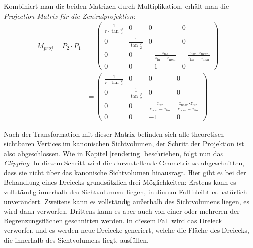 Kombiniert man die beiden Matrizen durch Multiplikation, erhält man die \emph{Projection Matrix für die Zentralprojektion}:
\begin{equation}
\begin{split}
 M_{proj} = P_2 \cdot P_1 &= 
 \begin{pmatrix}
  \frac{1}{r \cdot \tan\frac{\varphi}{2}} & 0 & 0 & 0 \\
  0 & \frac{1}{\tan\frac{\varphi}{2}} & 0 & 0 \\
  0 & 0 & -\frac{z_\mathrm{far}}{z_\mathrm{far}-z_\mathrm{near}} & -\frac{z_\mathrm{far} \cdot z_\mathrm{near}}{z_\mathrm{far}-z_\mathrm{near}} \\
  0 & 0 & -1 & 0
 \end{pmatrix} \\
 &= 
 \begin{pmatrix}
  \frac{1}{r \cdot \tan\frac{\varphi}{2}} & 0 & 0 & 0 \\
  0 & \frac{1}{\tan\frac{\varphi}{2}} & 0 & 0 \\
  0 & 0 & \frac{z_\mathrm{far}}{z_\mathrm{near}-z_\mathrm{far}} & \frac{z_\mathrm{near} \cdot z_\mathrm{far}}{z_\mathrm{near}-z_\mathrm{far}} \\
  0 & 0 & -1 & 0
 \end{pmatrix}
\end{split}
\end{equation}


Nach der Transformation mit dieser Matrix befinden sich alle theoretisch sichtbaren Vertices im kanonischen Sichtvolumen, der Schritt der Projektion ist also abgeschlossen. Wie in Kapitel \ref{rendering} beschrieben, folgt nun das \emph{Clipping}. In diesem Schritt wird die darzustellende Geometrie so abgeschnitten, dass sie nicht über das kanonische Sichtvolumen hinausragt. Hier gibt es bei der Behandlung eines Dreiecks grundsätzlich drei Möglichkeiten: Erstens kann es vollständig innerhalb des Sichtvolumens liegen, in diesem Fall bleibt es natürlich unverändert. Zweitens kann es vollständig außerhalb des Sichtvolumens liegen, es wird dann verworfen. Drittens kann es aber auch von einer oder mehreren der Begrenzungsflächen geschnitten werden. In diesem Fall wird das Dreieck verworfen und es werden neue Dreiecke generiert, welche die Fläche des Dreiecks, die innerhalb des Sichtvolumens liegt, ausfüllen.


